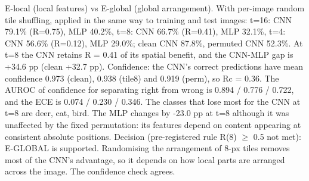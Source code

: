 E-local (local features) vs E-global (global arrangement). With per-image random tile shuffling, applied in the same way to training and test images: t=16: CNN 79.1\% (R=0.75), MLP 40.2\%, t=8: CNN 66.7\% (R=0.41), MLP 32.1\%, t=4: CNN 56.6\% (R=0.12), MLP 29.0\%; clean CNN 87.8\%, permuted CNN 52.3\%. At t=8 the CNN retains R = 0.41 of its spatial benefit, and the CNN-MLP gap is +34.6 pp (clean +32.7 pp). Confidence: the CNN's correct predictions have mean confidence 0.973 (clean), 0.938 (tile8) and 0.919 (perm), so Rc = 0.36. The AUROC of confidence for separating right from wrong is 0.894 / 0.776 / 0.722, and the ECE is 0.074 / 0.230 / 0.346. The classes that lose most for the CNN at t=8 are deer, cat, bird. The MLP changes by -23.0 pp at t=8 although it was unaffected by the fixed permutation: its features depend on content appearing at consistent absolute positions. Decision (pre-registered rule R(8) $\geq$ 0.5 not met): E-GLOBAL is supported. Randomising the arrangement of 8-px tiles removes most of the CNN's advantage, so it depends on how local parts are arranged across the image. The confidence check agrees.
